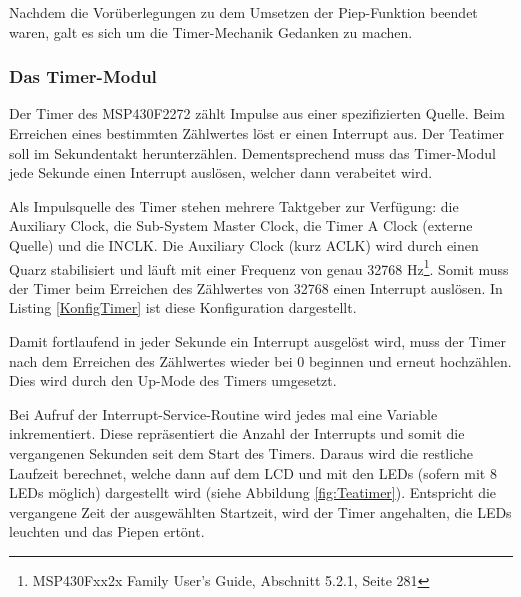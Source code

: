 \documentclass[12pt,a4paper,bibliography=totocnumbered,listof=totocnumbered]{scrartcl}
\begin{document}
Nachdem die Vorüberlegungen zu dem Umsetzen der Piep-Funktion beendet waren, galt es sich um die Timer-Mechanik Gedanken zu machen.

\subsubsection{Das Timer-Modul}
\label{TeatimerTimerA}

Der Timer des MSP430F2272 zählt Impulse aus einer spezifizierten Quelle. Beim Erreichen eines bestimmten Zählwertes löst er einen Interrupt aus. Der Teatimer soll im Sekundentakt herunterzählen. Dementsprechend muss das Timer-Modul jede Sekunde einen Interrupt auslösen, welcher dann verabeitet wird. 

Als Impulsquelle des Timer stehen mehrere Taktgeber zur Verfügung: die Auxiliary Clock, die Sub-System Master Clock, die Timer A Clock (externe Quelle) und die INCLK. Die Auxiliary Clock (kurz ACLK) wird durch einen Quarz stabilisiert und läuft mit einer Frequenz von genau 32768 Hz\footnote{MSP430Fxx2x Family User's Guide, Abschnitt 5.2.1, Seite 281}. Somit muss der Timer beim Erreichen des Zählwertes von 32768 einen Interrupt auslösen. In Listing \ref{KonfigTimer} ist diese Konfiguration dargestellt.

\vspace{1em}


Damit fortlaufend in jeder Sekunde ein Interrupt ausgelöst wird, muss der Timer nach dem Erreichen des Zählwertes wieder bei 0 beginnen und erneut hochzählen. Dies wird durch den Up-Mode des Timers umgesetzt.

\vspace{1em}


Bei Aufruf der Interrupt-Service-Routine wird jedes mal eine Variable inkrementiert. Diese repräsentiert die Anzahl der Interrupts und somit die vergangenen Sekunden seit dem Start des Timers. Daraus wird die restliche Laufzeit berechnet, welche dann auf dem LCD und mit den LEDs (sofern mit 8 LEDs möglich) dargestellt wird (siehe Abbildung \ref{fig:Teatimer}). Entspricht die vergangene Zeit der ausgewählten Startzeit, wird der Timer angehalten, die LEDs leuchten und das Piepen ertönt.

\vspace{1em}

\end{document}
